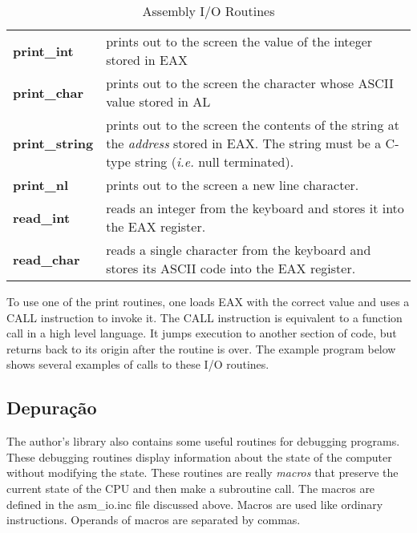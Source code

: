 \begin{table}[t]
\centering
\begin{tabular}{lp{3.5in}}
{\bf print\_int} & prints out to the screen the value of the integer stored
                  in EAX \\
{\bf print\_char} & prints out to the screen the character whose
                    ASCII value stored in AL \\
{\bf print\_string} & prints out to the screen the contents of the string
                     at the {\em address} stored in EAX. The string must be
                     a C-type string ({\em i.e.} null terminated). \\
{\bf print\_nl} & prints out to the screen a new line character. \\
{\bf read\_int} & reads an integer from the keyboard and stores it into the
                 EAX register. \\
{\bf read\_char} & reads a single character from the keyboard and stores its
                  ASCII code into the EAX register. \\
\end{tabular}
\caption{Assembly I/O Routines \label{tab:asmio} 
 
 
}
\end{table}

To use one of the print routines, one loads EAX with the correct value and
uses a {\code CALL} instruction to invoke it. The {\code CALL} instruction
is equivalent to a function call in a high level language. It jumps execution
to another section of code, but returns back to its origin after the routine
is over. The example program below shows several examples of calls to these
I/O routines.

\subsection{Depuração}

The author's library also contains some useful routines for debugging
programs. These debugging routines display information about the state of
the computer without modifying the state. These routines are really
\emph{macros} that preserve the current state of the CPU and then make a
subroutine call. The macros are defined in the {\code asm\_io.inc} file
discussed above. Macros are used like ordinary instructions. Operands of
macros are separated by commas.

